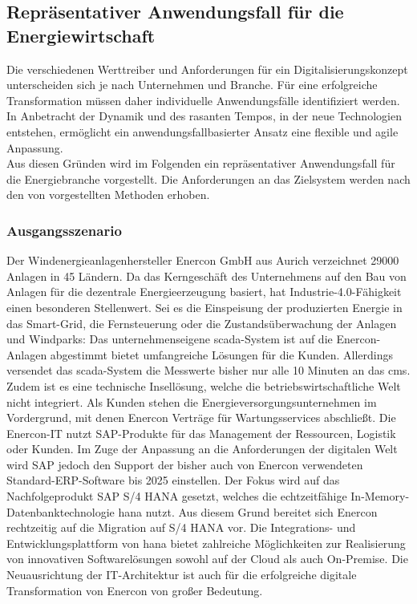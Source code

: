 \subsection{Repräsentativer Anwendungsfall für die Energiewirtschaft}\label{usecase}

Die verschiedenen Werttreiber und Anforderungen für ein Digitalisierungskonzept unterscheiden sich je nach Unternehmen und Branche.
Für eine erfolgreiche Transformation müssen daher individuelle Anwendungsfälle identifiziert werden.
In Anbetracht der Dynamik und des rasanten Tempos, in der neue Technologien entstehen,
ermöglicht ein anwendungsfallbasierter Ansatz eine flexible und agile Anpassung. \citep[S. 31]{Acharya2019}
\\Aus diesen Gründen wird im Folgenden ein repräsentativer Anwendungsfall für die Energiebranche vorgestellt. Die Anforderungen an das Zielsystem werden nach den von \citet{Lauenroth2016} vorgestellten Methoden erhoben.

\subsubsection{Ausgangsszenario} \label{usecase}

Der Windenergieanlagenhersteller Enercon GmbH aus Aurich verzeichnet 29000 Anlagen in 45 Ländern. Da das Kerngeschäft des Unternehmens auf den Bau von Anlagen für die dezentrale Energieerzeugung basiert, hat Industrie-4.0-Fähigkeit einen besonderen Stellenwert. Sei es die Einspeisung der produzierten Energie in das Smart-Grid, die Fernsteuerung oder die Zustandsüberwachung der Anlagen und Windparks: Das unternehmenseigene \acf{scada}-System ist auf die Enercon-Anlagen abgestimmt bietet umfangreiche Lösungen für die Kunden. Allerdings versendet das \ac{scada}-System die Messwerte bisher nur alle 10 Minuten an das \ac{cms}. Zudem ist es eine technische Insellösung, welche die betriebswirtschaftliche Welt nicht integriert. Als Kunden stehen die Energieversorgungsunternehmen im Vordergrund, mit denen Enercon Verträge für Wartungsservices abschließt. Die Enercon-IT nutzt SAP-Produkte für das Management der Ressourcen, Logistik oder Kunden. Im Zuge der Anpassung an die Anforderungen der digitalen Welt wird SAP jedoch den Support der bisher auch von Enercon verwendeten Standard-ERP-Software bis 2025 einstellen. Der Fokus wird auf das Nachfolgeprodukt SAP S/4 HANA gesetzt, welches die echtzeitfähige In-Memory-Datenbanktechnologie \acf{hana} nutzt. Aus diesem Grund bereitet sich Enercon rechtzeitig auf die Migration auf S/4 HANA vor. Die Integrations- und Entwicklungsplattform von \ac{hana} bietet zahlreiche Möglichkeiten zur Realisierung von innovativen Softwarelösungen sowohl auf der Cloud als auch On-Premise. Die Neuausrichtung der IT-Architektur ist auch für die erfolgreiche digitale Transformation von Enercon von großer Bedeutung.

